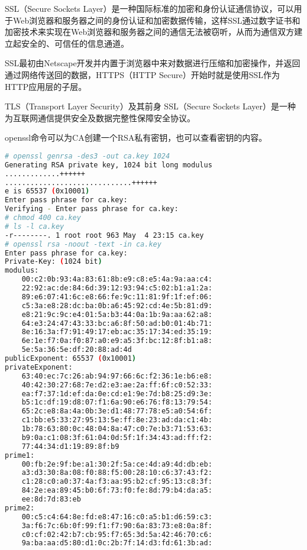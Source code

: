 SSL（Secure Sockets Layer）是一种国际标准的加密和身份认证通信协议，可以用于Web浏览器和服务器之间的身份认证和加密数据传输，这样SSL通过数字证书和加密技术来实现在Web浏览器和服务器之间的通信无法被窃听，从而为通信双方建立起安全的、可信任的信息通道。

SSL最初由Netscape开发并内置于浏览器中来对数据进行压缩和加密操作，并返回通过网络传送回的数据，HTTPS（HTTP Secure）开始时就是使用SSL作为HTTP应用层的子层。

TLS（Transport Layer Security）及其前身 SSL（Secure Sockets Layer）是一种为互联网通信提供安全及数据完整性保障安全协议。

openssl命令可以为CA创建一个RSA私有密钥，也可以查看密钥的内容。



\begin{lstlisting}[language=bash]
# openssl genrsa -des3 -out ca.key 1024
Generating RSA private key, 1024 bit long modulus
.............++++++
..............................++++++
e is 65537 (0x10001)
Enter pass phrase for ca.key:
Verifying - Enter pass phrase for ca.key:
# chmod 400 ca.key
# ls -l ca.key
-r--------. 1 root root 963 May  4 23:15 ca.key
# openssl rsa -noout -text -in ca.key 
Enter pass phrase for ca.key:
Private-Key: (1024 bit)
modulus:
    00:c2:0b:93:4a:83:61:8b:e9:c8:e5:4a:9a:aa:c4:
    22:92:ac:de:84:6d:39:12:93:94:c5:02:b1:a1:2a:
    89:e6:07:41:6c:e8:66:fe:9c:11:81:9f:1f:ef:06:
    c5:3a:e8:28:dc:ba:0b:a6:45:92:cd:4e:5b:81:d9:
    e8:21:9c:9c:e4:01:5a:b3:44:0a:1b:9a:aa:62:a8:
    64:e3:24:47:43:33:bc:a6:8f:50:ad:b0:01:4b:71:
    8e:16:3a:f7:91:49:17:eb:ac:35:17:34:ed:35:19:
    6e:1e:f7:0a:f0:87:a0:e9:a5:3f:bc:12:8f:b1:a8:
    5e:5a:36:5e:df:20:88:ad:4d
publicExponent: 65537 (0x10001)
privateExponent:
    63:40:ec:7c:26:ab:94:97:66:6c:f2:36:1e:b6:e8:
    40:42:30:27:68:7e:d2:e3:ae:2a:ff:6f:c0:52:33:
    ea:f7:37:1d:ef:da:0e:cd:e1:9e:7d:b8:25:d9:3e:
    b5:1c:df:19:d8:07:f1:6a:90:e6:76:f8:13:79:54:
    65:2c:e8:8a:4a:0b:3e:d1:48:77:78:e5:a0:54:6f:
    c1:bb:e5:33:27:95:13:5e:ff:8e:23:ad:da:c1:4b:
    1b:78:63:80:0c:48:04:8a:47:c0:7e:b3:71:53:63:
    b9:0a:c1:08:3f:61:04:0d:5f:1f:34:43:ad:ff:f2:
    77:44:34:d1:19:89:8f:b9
prime1:
    00:fb:2e:9f:be:a1:30:2f:5a:ce:4d:a9:4d:db:eb:
    a3:d3:30:8a:08:f0:88:f5:00:28:10:c6:37:43:f2:
    c1:28:c0:a0:37:4a:f3:aa:95:b2:cf:95:13:c8:3f:
    84:2e:ea:89:45:b0:6f:73:f0:fe:8d:79:b4:da:a5:
    ee:8d:7d:83:eb
prime2:
    00:c5:c4:64:8e:fd:e8:47:16:c0:a5:b1:d6:59:c3:
    3a:f6:7c:6b:0f:99:f1:f7:90:6a:83:73:e8:0a:8f:
    c0:cf:02:42:b7:cb:95:f7:65:3d:5a:42:46:70:c6:
    9a:ba:aa:d5:80:d1:0c:2b:7f:14:d3:fd:61:3b:ad:

\end{lstlisting}
